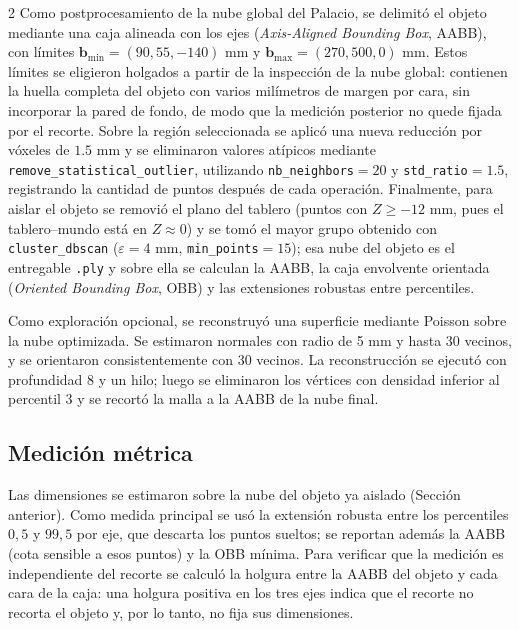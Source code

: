 \documentclass[10pt,a4paper]{article}
\begin{document}
\begin{multicols}{2}
Como postprocesamiento de la nube global del Palacio, se delimitó el objeto mediante una caja
alineada con los ejes (\textit{Axis-Aligned Bounding Box}, AABB), con límites $\mathbf{b}_{\min}=(90,55,-140)$ mm y
$\mathbf{b}_{\max}=(270,500,0)$ mm. Estos límites se eligieron holgados a partir de la inspección de la nube global:
contienen la huella completa del objeto con varios milímetros de margen por cara, sin incorporar la pared de fondo,
de modo que la medición posterior no quede fijada por el recorte.
Sobre la región seleccionada se aplicó una nueva reducción por vóxeles de $1.5$ mm y se eliminaron valores atípicos
mediante \texttt{remove\_statistical\_outlier}, utilizando \texttt{nb\_neighbors}$=20$ y \texttt{std\_ratio}$=1.5$,
registrando la cantidad de puntos después de cada operación. Finalmente, para aislar el objeto se removió el plano del
tablero (puntos con $Z\ge-12$ mm, pues el tablero--mundo está en $Z\approx0$) y se tomó el mayor grupo obtenido con
\texttt{cluster\_dbscan} ($\varepsilon=4$ mm, \texttt{min\_points}$=15$); esa nube del objeto es el entregable
\texttt{.ply} y sobre ella se calculan la AABB, la caja envolvente orientada (\textit{Oriented Bounding Box}, OBB)
y las extensiones robustas entre percentiles.

Como exploración opcional, se reconstruyó una superficie mediante Poisson sobre la nube
optimizada. Se estimaron normales con radio de 5 mm y hasta 30 vecinos, y se orientaron
consistentemente con 30 vecinos. La reconstrucción se ejecutó con profundidad 8 y un hilo;
luego se eliminaron los vértices con densidad inferior al percentil 3 y se recortó la malla
a la AABB de la nube final.

\subsection{Medición métrica}
Las dimensiones se estimaron sobre la nube del objeto ya aislado (Sección anterior). Como medida principal se usó la
extensión robusta entre los percentiles $0{,}5$ y $99{,}5$ por eje, que descarta los puntos sueltos; se reportan además
la AABB (cota sensible a esos puntos) y la OBB mínima. Para verificar que la medición es independiente del recorte se
calculó la holgura entre la AABB del objeto y cada cara de la caja: una holgura positiva en los tres ejes indica que el
recorte no recorta el objeto y, por lo tanto, no fija sus dimensiones.


\end{multicols}
\end{document}
